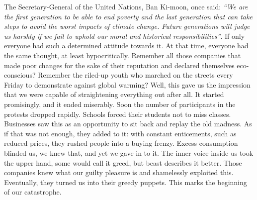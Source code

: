 \documentclass[]{book}
\begin{document}
The Secretary-General of the United Nations, Ban Ki-moon, once said: \emph{``We are the first generation to be able to end poverty and the last generation that can take steps to avoid the worst impacts of climate change. Future generations will judge us harshly if we fail to uphold our moral and historical responsibilities''}. If only everyone had such a determined attitude towards it. At that time, everyone had the same thought, at least hypocritically. Remember all those companies that made poor changes for the sake of their reputation and declared themselves eco-conscious? Remember the riled-up youth who marched on the streets every Friday to demonstrate against global warming? Well, this gave us the impression that we were capable of straightening everything out after all. It started promisingly, and it ended miserably. Soon the number of participants in the protests dropped rapidly. Schools forced their students not to miss classes. Businesses saw this as an opportunity to sit back and replay the old madness. As if that was not enough, they added to it: with constant enticements, such as reduced prices, they rushed people into a buying frenzy. Excess consumption blinded us, we knew that, and yet we gave in to it. The inner voice inside us took the upper hand, some would call it greed, but beast describes it better. Those companies knew what our guilty pleasure is and shamelessly exploited this. Eventually, they turned us into their greedy puppets. This marks the beginning of our catastrophe.
\end{document}
